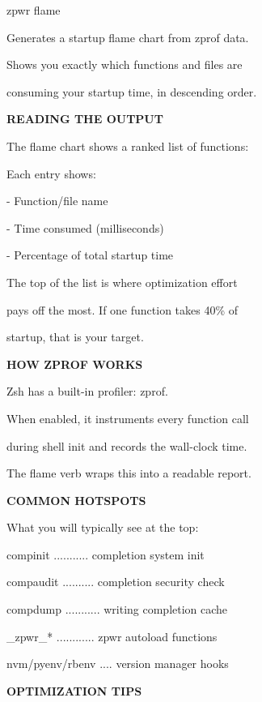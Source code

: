 \documentclass[11pt,a4paper,twoside]{book}
\begin{document}
\begin{codebox}
zpwr flame\\
\end{codebox}

Generates a startup flame chart from zprof data.

Shows you exactly which functions and files are

consuming your startup time, in descending order.


\vspace{12pt}
{\bfseries\color{neonyellow} READING THE OUTPUT}\vspace{4pt}

The flame chart shows a ranked list of functions:

Each entry shows:

- Function/file name

- Time consumed (milliseconds)

- Percentage of total startup time

The top of the list is where optimization effort

pays off the most. If one function takes 40\% of

startup, that is your target.


\vspace{12pt}
{\bfseries\color{neonyellow} HOW ZPROF WORKS}\vspace{4pt}

Zsh has a built-in profiler: zprof.

When enabled, it instruments every function call

during shell init and records the wall-clock time.

The flame verb wraps this into a readable report.


\vspace{12pt}
{\bfseries\color{neonyellow} COMMON HOTSPOTS}\vspace{4pt}

What you will typically see at the top:

compinit ........... completion system init

compaudit .......... completion security check

compdump ........... writing completion cache

\_zpwr\_* ............ zpwr autoload functions

nvm/pyenv/rbenv .... version manager hooks


\vspace{12pt}
{\bfseries\color{neonyellow} OPTIMIZATION TIPS}\vspace{4pt}
\end{document}
